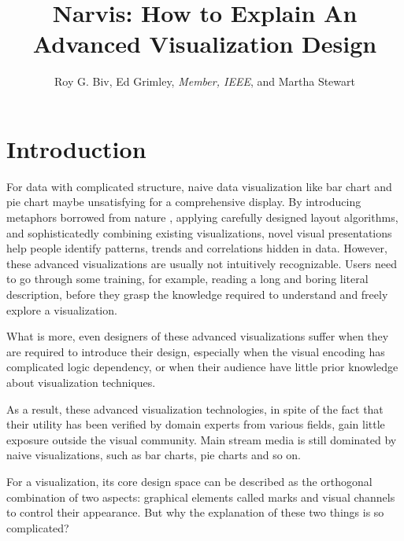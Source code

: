 \documentclass[review,journal]{vgtc}         %
\title{Narvis: How to Explain An Advanced Visualization Design}
\author{Roy G. Biv, Ed Grimley, \textit{Member, IEEE}, and Martha Stewart}
\begin{document}
 


\maketitle
 
\section{Introduction} %
For data with complicated structure, naive data visualization like bar chart and pie chart maybe unsatisfying for a comprehensive display. By introducing metaphors borrowed from nature \cite{cao_whisper:_2012,huron_visual_2013}, applying carefully designed layout algorithms\cite{wu_opinionflow:_2014,chi_morphable_2015}, and sophisticatedly combining existing visualizations\cite{zhao_x0023;fluxflow:_2014}, novel visual presentations help people identify patterns, trends and correlations hidden in data. However, these advanced visualizations are usually not intuitively recognizable. Users need to go through some training, for example, reading a long and boring literal description, before they grasp the knowledge required to understand and freely explore a visualization.\par
What is more, even designers of these advanced visualizations suffer when they are required to introduce their design, especially when the visual encoding has complicated logic dependency, or when their audience have little prior knowledge about visualization techniques.\par
As a result, these advanced visualization technologies, in spite of
the fact that their utility has been verified by domain experts from various fields, gain little exposure outside the visual community. Main stream media is still dominated by naive visualizations, such as bar charts, pie charts and so on.

For a visualization, its core design space can be described as the orthogonal combination of two aspects: graphical elements called marks and visual channels to control their appearance\cite{munzner_visualization_2014}. But why the explanation of these two things is so complicated? 
\end{document}
